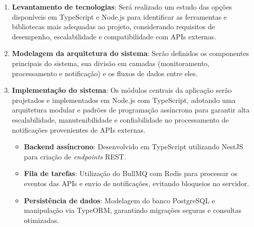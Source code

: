     \begin{enumerate}
        \item \textbf{Levantamento de tecnologias}:
            Será realizado um estudo das opções disponíveis em TypeScript e Node.js para identificar as ferramentas e bibliotecas mais adequadas ao projeto, considerando requisitos de desempenho, escalabilidade e compatibilidade com APIs externas.
        \par\vspace{0.5\baselineskip}
        
        \item \textbf{Modelagem da arquitetura do sistema}: 
            Serão definidos os componentes principais do sistema, sua divisão em camadas (monitoramento, processamento e notificação) e os fluxos de dados entre eles.
        \par\vspace{0.5\baselineskip}
        
        \item \textbf{Implementação do sistema}: 
            Os módulos centrais da aplicação serão projetados e implementados em Node.js com TypeScript, adotando uma arquitetura modular e padrões de programação assíncrona para garantir alta escalabilidade, manutenibilidade e confiabilidade no processamento de notificações provenientes de APIs externas.  
        \par\vspace{0.25\baselineskip}
        
            \begin{itemize}
                \item \textbf{Backend assíncrono}: 
                    Desenvolvido em TypeScript utilizando NestJS para criação de \textit{endpoints} REST.  
                \par\vspace{0.25\baselineskip}
    
                \item \textbf{Fila de tarefas}: 
                    Utilização do BullMQ com Redis para processar os eventos das APIs e envio de notificações, evitando bloqueios no servidor.  
                \par\vspace{0.25\baselineskip}
    
                \item \textbf{Persistência de dados}: 
                    Modelagem do banco PostgreSQL e manipulação via TypeORM, garantindo migrações seguras e consultas otimizadas.  
                \par\vspace{0.25\baselineskip}
    

\end{itemize}
\end{enumerate}
